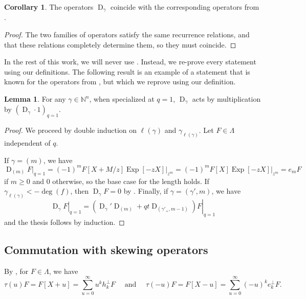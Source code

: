 \documentclass[reqno]{amsart}
\theoremstyle{plain}
\theoremstyle{definition}
\newtheorem{corollary}[theorem]{Corollary}
\newtheorem{lemma}[theorem]{Lemma}
\theoremstyle{remark}
\DeclareMathOperator{\D}{D}
\DeclareMathOperator{\Exp}{Exp}
\newcommand{\<}{\langle}
\renewcommand{\>}{\rangle}
\begin{document}
\begin{corollary}
    \label{cor:same_operators}
    The operators $\D_\gamma$ coincide with the corresponding operators from \cite[Equation~(52)]{BHMPS2023ShuffleAnyLine}.
\end{corollary}

\begin{proof}
    The two families of operators satisfy the same recurrence relations, and that these relations completely determine them, so they must coincide.
\end{proof}

In the rest of this work, we will never use . Instead, we re-prove every statement using our definitions. The following result is an example of a statement that is known for the operators from \cite{BHMPS2023ShuffleAnyLine}, but which we reprove using our definition.

\begin{lemma}
    \label{lem:Dgamma_q1}
    For any $\gamma \in \mathbb{N}^n$, when specialized at $q=1$, $\D_\gamma$ acts by multiplication by $\left( \D_\gamma \cdot 1 \right)_{q=1} $.
\end{lemma}

\begin{proof}
    We proceed by double induction on $\ell(\gamma)$ and $\gamma_{\ell(\gamma)}$. Let $F \in \Lambda$ independent of $q$.
    
    If $\gamma = (m)$, we have
    \[ \D_{(m)} F \rvert_{q=1} = (-1)^m F[X + M/z] \Exp[-zX] \rvert_{z^m} = (-1)^m F[X] \Exp[-zX] \rvert_{z^m} = e_m F \]
    if $m \geq 0$ and $0$ otherwise, so the base case for the length holds. If $\gamma_{\ell(\gamma)} < - \deg(f)$, then $\D_\gamma F = 0$ by . Finally, if $\gamma = (\gamma', m)$, we have
    \[ \left. \D_\gamma F \right\rvert_{q=1} = \left. \left( \D_\gamma' \D_{(m)} + qt \D_{(\gamma'_+, m-1)} \right) F \right\rvert_{q=1} \]
    and the thesis follows by induction.
\end{proof}

\subsection{Commutation with skewing operators}

By , for $F \in \Lambda$, we have
\[ \tau(u) F = F[X+u] = \sum_{u=0}^\infty u^k h_k^\perp F \quad \text{ and } \quad \tau(-u) F = F[X-u] = \sum_{u=0}^\infty (-u)^k e_k^\perp F. \]
\end{document}
